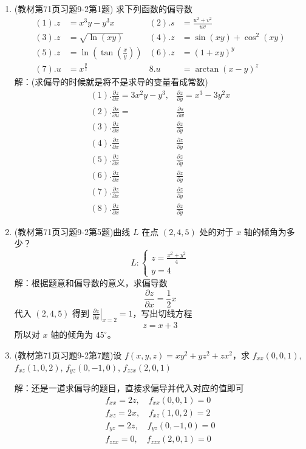 \begin{enumerate}
\item (教材第71页习题9-2第1题) 求下列函数的偏导数
\begin{align*}
(1). z &= x^3y-y^3x  & (2). s &= \frac{u^2+v^2}{u v} \\
(3). z &= \sqrt{\ln(x y)} &   (4). z &= \sin(x y)  + \cos ^2(x y) \\
(5). z &= \ln(\tan(\frac{x}{y})) & (6). z &= (1+x y)^y \\
(7). u &= x^{\frac{y}{z}} & 8. u &= \arctan (x-y)^z 
\end{align*}
解：(求偏导的时候就是将不是求导的变量看成常数)
\begin{align*}
    (1). \frac{\partial z }{\partial x} = 3x^2y - y^3, & \frac{\partial z }{\partial y} = x^3 - 3y^2 x \\
    (2). \frac{\partial s}{\partial u} = &  \frac{\partial s}{\partial w} \\
    (3). \frac{\partial z}{\partial x} & \frac{\partial z}{\partial y} \\
    (4). \frac{\partial z}{\partial x} & \frac{\partial z}{\partial y} \\
    (5). \frac{\partial z}{\partial x} & \frac{\partial z}{\partial y} \\
    (6). \frac{\partial z}{\partial x} & \frac{\partial z}{\partial y} \\
    (7). \frac{\partial z}{\partial x} & \frac{\partial z}{\partial y} \\
    (8). \frac{\partial z}{\partial x} & \frac{\partial z}{\partial y}
\end{align*}


\item (教材第71页习题9-2第5题)曲线 $L$ 在点 $(2,4,5)$ 处的对于 $x$ 轴的倾角为多少？
$$
L: \left\{\begin{matrix}
z = \frac{x^2+y^2}{4}\\
y = 4
\end{matrix}\right.
$$
解：根据题意和偏导数的意义，求偏导数
\begin{equation*}
    \frac{\partial z}{\partial x} = \frac{1}{2} x
\end{equation*}
代入 $(2,4,5)$ 得到 $ \left. \frac{\partial z}{\partial x} \right|_{x=2} = 1$，写出切线方程
\begin{equation*}
    z = x + 3
\end{equation*}
所以对 $x$ 轴的倾角为 $45 ^ \circ$。

\item (教材第71页习题9-2第7题)设 $f(x,y,z) = x y^2+y z^2+z x^2$，求 $f_{xx}(0,0,1)$, $f_{xz}(1,0,2)$, $f_{yz}(0,-1,0)$, $f_{zzx}(2,0,1)$

解：还是一道求偏导的题目，直接求偏导并代入对应的值即可
\begin{align*}
    f_{xx} = 2z , \quad f_{xx}(0,0,1) = 0 \\
    f_{xz} = 2x , \quad f_{xz}(1,0,2) = 2 \\
    f_{yz} = 2z , \quad f_{yz}(0,-1,0) = 0 \\
    f_{zzx} = 0 , \quad f_{zzx}(2,0,1) = 0
\end{align*}
\end{enumerate}


